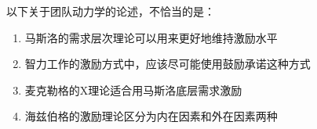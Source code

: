 \begin{problem}
	以下关于团队动力学的论述，不恰当的是： 
        \begin{enumerate}[label=\Alph*.]
            \item 马斯洛的需求层次理论可以用来更好地维持激励水平
            \item 智力工作的激励方式中，应该尽可能使用鼓励承诺这种方式
            \item 麦克勒格的X理论适合用马斯洛底层需求激励
            \item 海兹伯格的激励理论区分为内在因素和外在因素两种
        \end{enumerate}
\end{problem}



